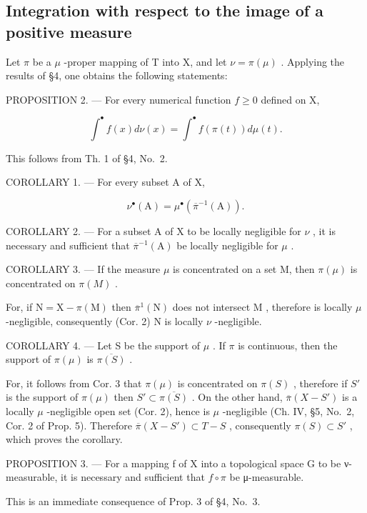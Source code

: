\subsection{Integration with respect to the image of a positive measure}

Let \(\pi\) be a \(\mu\) -proper mapping of T into X, and let \(\nu = \pi(\mu)\) . Applying the results of §4, one obtains the following statements:

PROPOSITION 2. --- For every numerical function \(f \geqslant 0\) defined on X,

\[
\int^ {\bullet} f (x) d \nu (x) = \int^ {\bullet} f (\pi (t)) d \mu (t).\tag{2}
\]

This follows from Th. 1 of §4, No.~2.

COROLLARY 1. --- For every subset A of X,

\[
\nu^ {\bullet} (\mathrm{A}) = \mu^ {\bullet} \left(\overline {{\pi}} ^ {- 1} (\mathrm{A})\right).
\]

COROLLARY 2. --- For a subset A of X to be locally negligible for \(\nu\) , it is necessary and sufficient that \(\overline{\pi}^{-1}(\mathrm{A})\) be locally negligible for \(\mu\) .

COROLLARY 3. --- If the measure \(\mu\) is concentrated on a set M, then \(\pi(\mu)\) is concentrated on \(\pi(M)\) .

For, if \(\mathrm{N} = \mathrm{X} - \pi(\mathrm{M})\) then \(\overline{\pi}^1(\mathrm{N})\) does not intersect \(\mathrm{M}\) , therefore is locally \(\mu\) -negligible, consequently (Cor. 2) \(\mathrm{N}\) is locally \(\nu\) -negligible.

COROLLARY 4. --- Let S be the support of \(\mu\) . If \(\pi\) is continuous, then the support of \(\pi(\mu)\) is \(\overline{\pi(S)}\) .

For, it follows from Cor. 3 that \(\pi(\mu)\) is concentrated on \(\pi(S)\) , therefore if \(S'\) is the support of \(\pi(\mu)\) then \(S' \subset \overline{\pi(S)}\) . On the other hand, \(\overline{\pi}(X - S')\) is a locally \(\mu\) -negligible open set (Cor. 2), hence is \(\mu\) -negligible (Ch. IV, §5, No.~2, Cor. 2 of Prop. 5). Therefore \(\overline{\pi}(X - S') \subset T - S\) , consequently \(\pi(S) \subset S'\) , which proves the corollary.

PROPOSITION 3. --- For a mapping f of X into a topological space G to be ν-measurable, it is necessary and sufficient that \(f \circ \pi\) be μ-measurable.

This is an immediate consequence of Prop. 3 of §4, No.~3.

